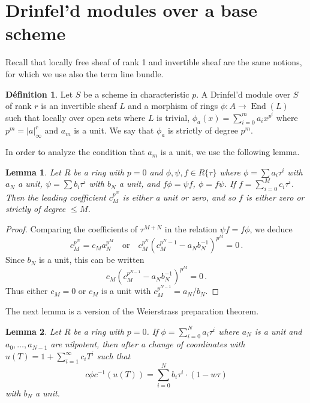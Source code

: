 \documentclass[12pt,a4paper]{article}
\theoremstyle{plain}
\newtheorem{lemma}{Lemma}[section]
\theoremstyle{definition}
\newtheorem{definition}{D\'efinition}[section]
\theoremstyle{remark}
\DeclareMathOperator{\End}{End}
\begin{document}
\section{Drinfel'd modules over a base scheme}

Recall that locally free sheaf of rank 1 and invertible sheaf are the same 
notions, for which we use also the term line bundle.

\begin{definition}
Let $S$ be a scheme in characteristic $p$. A Drinfel'd module over $S$ of 
rank $r$ is an invertible sheaf $L$ and a morphism of rings 
$\phi\colon A \to \End(L)$ such that locally over open sets where $L$ is 
trivial, $\phi_a(x) = \sum_{i=0}^m a_i x^{p^i}$ where $p^m = |a|_\infty^r$ and 
$a_m$ is a unit. We say that $\phi_a$ is strictly of degree $p^m$.
\end{definition}

In order to analyze the condition that $a_m$ is a unit, we use the following 
lemma.

\begin{lemma}
Let $R$ be a ring with $p = 0$ and $\phi, \psi, f \in R\{\tau\}$ where 
$\phi = \sum a_i \tau^i$ with $a_N$ a unit, $\psi = \sum b_i \tau^i$ with $b_N$ 
a unit, and $f\phi = \psi f$, $\phi = f \psi$. If $f = \sum_{i=0}^M c_i \tau^i$. 
Then the leading coefficient $c_M^{p^N}$ is either a unit or zero, and so $f$ 
is either zero or strictly of degree $\leqslant M$.
\end{lemma}

\begin{proof}
Comparing the coefficients of $\tau^{M+N}$ in the relation 
$\psi f = f \phi$, we deduce
\[
c_M^{p^N} = c_M a_N^{p^M} \quad\text{or}\quad c_M^{p^N}(c_M^{p^N-1} - a_N b_N^{-1})^{p^M} = 0 \,.
\]
Since $b_N$ is a unit, this can be written
\[
c_M(c_M^{p^{N-1}} - a_N b_N^{-1})^{p^M} = 0 \,.
\]
Thus either $c_M = 0$ or $c_M$ is a unit with $c_M^{p^{N-1}} = a_N/b_N$.
\end{proof}

The next lemma is a version of the Weierstrass preparation theorem.

\begin{lemma}
Let $R$ be a ring with $p = 0$. If $\phi = \sum_{i=0}^N a_i \tau^i$ where $a_N$ 
is a unit and $a_0, \ldots, a_{N-1}$ are nilpotent, then after a change of 
coordinates with $u(T) = 1 + \sum_{i=1}^\infty c_i T^i$ such that
\[
c\phi c^{-1}(u(T)) = \sum_{i=0}^N b_i \tau^i \cdot (1 - w\tau)
\]
with $b_N$ a unit.
\end{lemma}
\end{document}
